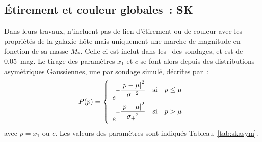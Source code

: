 \documentclass[../main/main.tex]{subfiles}
\begin{document}
\subsection{Étirement et couleur globales~: SK}\label{ssec:sk}

Dans leurs travaux,  n'incluent pas de lien d'étirement
ou de couleur avec les propriétés de la galaxie hôte mais uniquement une marche
de magnitude en fonction de sa masse $M_*$. Celle-ci est inclut dans les
\wgtmap\ des sondages, et est de \SI{0.05}{mag}. Le tirage des paramètres $x_1$
et $c$ se font alors depuis des distributions asymétriques Gaussiennes, une par
sondage simulé, décrites par~:
\begin{equation}\label{eq:skasym}
    P(p) = \left\{
        \begin{array}{l}
            e^{-\displaystyle\frac{\abs{p-\mu}^2}{\sigma_-{}^2}
                \quad\text{si}\quad p\leq\mu} \\
            e^{-\displaystyle\frac{\abs{p-\mu}^2}{\sigma_+{}^2}
                \quad\text{si}\quad p>\mu} \\
        \end{array}
        \right.
\end{equation}
avec $p = x_1$ ou $c$. Les valeurs des paramètres sont indiqués
Tableau~\ref{tab:skasym}.
\end{document}

